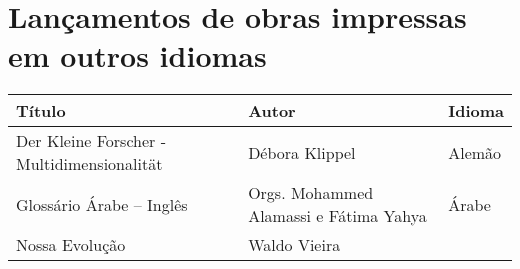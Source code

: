 \documentclass{gescons}
\begin{document}
\clearpage
{}
\section*{Lançamentos de obras impressas em outros idiomas}

\begin{longtable}[]{@{}
  >{\raggedright\arraybackslash}p{}
  >{\raggedright\arraybackslash}p{}
  >{\raggedright\arraybackslash}p{}@{}}
\toprule\noalign{}
\begin{minipage}[b]{\linewidth}\centering
\textbf{Título}
\end{minipage} & \begin{minipage}[b]{\linewidth}\centering
\textbf{Autor}
\end{minipage} & \begin{minipage}[b]{\linewidth}\centering
\textbf{Idioma}
\end{minipage} \\
\hline
\begin{minipage}[b]{\linewidth}\raggedright
Der Kleine Forscher - Multidimensionalität
\end{minipage} & \begin{minipage}[b]{\linewidth}\raggedright
Débora Klippel
\end{minipage} & \begin{minipage}[b]{\linewidth}\raggedright
Alemão
\end{minipage} \\
\hline
\begin{minipage}[b]{\linewidth}\raggedright
Glossário Árabe -- Inglês
\end{minipage} & \begin{minipage}[b]{\linewidth}\raggedright\addlinespace[2pt]
Orgs. Mohammed Alamassi e Fátima Yahya
\end{minipage} & \begin{minipage}[b]{\linewidth}\raggedright
Árabe
\end{minipage} \\
\hline
\begin{minipage}[b]{\linewidth}\raggedright
Nossa Evolução
\end{minipage} & \begin{minipage}[b]{\linewidth}\raggedright
Waldo Vieira
\end{minipage} & \begin{minipage}[b]{\linewidth}\raggedright

\end{minipage}
\end{longtable}
\end{document}
